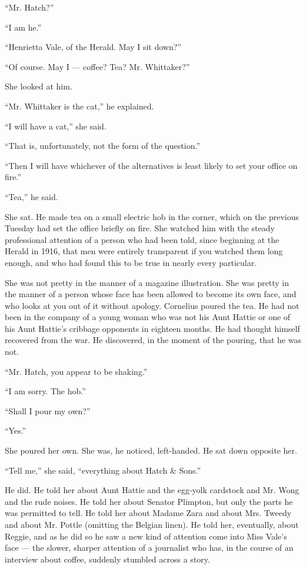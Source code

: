 \documentclass[12pt,openright]{book}
\begin{document}
“Mr. Hatch?”

“I am he.”

“Henrietta Vale, of the Herald. May I sit down?”

“Of course. May I — coffee? Tea? Mr. Whittaker?”

She looked at him.

“Mr. Whittaker is the cat,” he explained.

“I will have a cat,” she said.

“That is, unfortunately, not the form of the question.”

“Then I will have whichever of the alternatives is least likely to set your office on fire.”

“Tea,” he said.

She sat. He made tea on a small electric hob in the corner, which on the previous Tuesday had set the office briefly on fire. She watched him with the steady professional attention of a person who had been told, since beginning at the Herald in 1916, that men were entirely transparent if you watched them long enough, and who had found this to be true in nearly every particular.

She was not pretty in the manner of a magazine illustration. She was pretty in the manner of a person whose face has been allowed to become its own face, and who looks at you out of it without apology. Cornelius poured the tea. He had not been in the company of a young woman who was not his Aunt Hattie or one of his Aunt Hattie’s cribbage opponents in eighteen months. He had thought himself recovered from the war. He discovered, in the moment of the pouring, that he was not.

“Mr. Hatch, you appear to be shaking.”

“I am sorry. The hob.”

“Shall I pour my own?”

“Yes.”

She poured her own. She was, he noticed, left-handed. He sat down opposite her.

“Tell me,” she said, “everything about Hatch \& Sons.”

He did. He told her about Aunt Hattie and the egg-yolk cardstock and Mr. Wong and the rude noises. He told her about Senator Plimpton, but only the parts he was permitted to tell. He told her about Madame Zara and about Mrs. Tweedy and about Mr. Pottle (omitting the Belgian linen). He told her, eventually, about Reggie, and as he did so he saw a new kind of attention come into Miss Vale’s face — the slower, sharper attention of a journalist who has, in the course of an interview about coffee, suddenly stumbled across a story.
\end{document}
